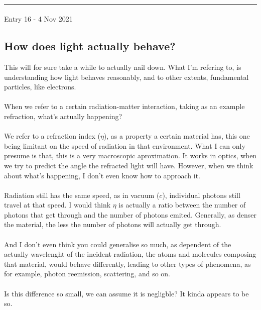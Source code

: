 \documentclass[12pt,  letterpaper]{article}
\begin{document}
\paragraph*{}
\hrule
\paragraph*{}
Entry 16 - 4 Nov 2021
\subsection*{How does light actually behave?}
This will for sure take a while to actually nail down. What I'm refering to, is understanding how light behaves reasonably, and to other extents, fundamental particles, like electrons.
\paragraph*{}
When we refer to a certain radiation-matter interaction, taking as an example refraction, what's actually happening?
\paragraph*{}
We refer to a refraction index ($\eta$), as a property a certain material has, this one being limitant on the speed of radiation in that environment. What I can only presume is that, this is a very macroscopic aproximation. It works in optics, when we try to predict the angle the refracted light will have. However, when we think about what's happening, I don't even know how to approach it. \paragraph*{}
Radiation still has the same speed, as in vacuum ($c$), individual photons still travel at that speed. I would think $\eta$ is actually a ratio between the number of photons that get through and the number of photons emited. Generally, as denser the material, the less the number of photons will actually get through.\paragraph*{}
And I don't even think you could generalise so much, as dependent of the actually wavelenght of the incident radiation, the atoms and molecules composing that material, would behave differently, leading to other types of phenomena, as for example, photon reemission, scattering, and so on.\paragraph*{}
Is this difference so small, we can assume it is negligble? It kinda appears to be so.
\end{document}
